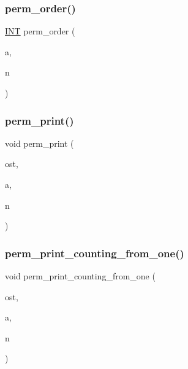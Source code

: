 \subsubsection{\texorpdfstring{perm\+\_\+order()}{perm\_order()}}
{\footnotesize\ttfamily \mbox{\hyperlink{galois_8h_a09fddde158a3a20bd2dcadb609de11dc}{I\+NT}} perm\+\_\+order (\begin{DoxyParamCaption}\item[{\mbox{\hyperlink{galois_8h_a09fddde158a3a20bd2dcadb609de11dc}{I\+NT}} $\ast$}]{a,  }\item[{\mbox{\hyperlink{galois_8h_a09fddde158a3a20bd2dcadb609de11dc}{I\+NT}}}]{n }\end{DoxyParamCaption})}

\mbox{\label{combinatorics_8_c_a2c7eee1361109e8c5b94921589815194}} 
\subsubsection{\texorpdfstring{perm\+\_\+print()}{perm\_print()}}
{\footnotesize\ttfamily void perm\+\_\+print (\begin{DoxyParamCaption}\item[{ostream \&}]{ost,  }\item[{\mbox{\hyperlink{galois_8h_a09fddde158a3a20bd2dcadb609de11dc}{I\+NT}} $\ast$}]{a,  }\item[{\mbox{\hyperlink{galois_8h_a09fddde158a3a20bd2dcadb609de11dc}{I\+NT}}}]{n }\end{DoxyParamCaption})}

\mbox{\label{combinatorics_8_c_a91b3b9c7df9739671c5e04743043dcff}} 
\subsubsection{\texorpdfstring{perm\+\_\+print\+\_\+counting\+\_\+from\+\_\+one()}{perm\_print\_counting\_from\_one()}}
{\footnotesize\ttfamily void perm\+\_\+print\+\_\+counting\+\_\+from\+\_\+one (\begin{DoxyParamCaption}\item[{ostream \&}]{ost,  }\item[{\mbox{\hyperlink{galois_8h_a09fddde158a3a20bd2dcadb609de11dc}{I\+NT}} $\ast$}]{a,  }\item[{\mbox{\hyperlink{galois_8h_a09fddde158a3a20bd2dcadb609de11dc}{I\+NT}}}]{n }\end{DoxyParamCaption})}

